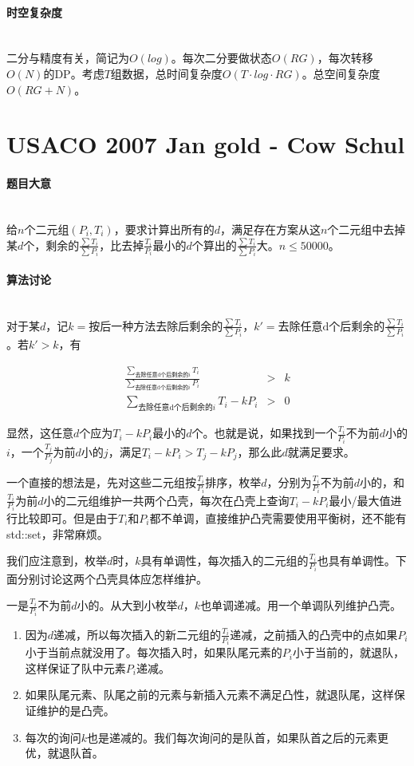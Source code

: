 \documentclass[UTF8]{ctexart}
\newcommand{\myparagraph}[1]{\paragraph{#1}\mbox{}\\}
\theoremstyle{nonumberplain}
\begin{document}
		\myparagraph{时空复杂度}
		
			二分与精度有关，简记为$O(log)$。每次二分要做状态$O(RG)$，每次转移$O(N)$的DP。考虑$T$组数据，总时间复杂度$O(T \cdot log \cdot RG)$。总空间复杂度$O(RG+N)$。
	
	\section{USACO 2007 Jan gold - Cow Schul}
	
		\myparagraph{题目大意}
		
			给$n$个二元组$(P_i,T_i)$，要求计算出所有的$d$，满足存在方案从这$n$个二元组中去掉某$d$个，剩余的$\frac{\sum T_i}{\sum P_i}$，比去掉$\frac{T_i}{P_i}$最小的$d$个算出的$\frac{\sum T_i}{\sum P_i}$大。$n \leq 50000$。
		
		\myparagraph{算法讨论}
		
			对于某$d$，记$k=\mbox{按后一种方法去除后剩余的}\frac{\sum T_i}{\sum P_i}$，$k'=\mbox{去除任意d个后剩余的}\frac{\sum T_i}{\sum P_i}$。若$k'>k$，有
			
			$$\begin{aligned}
				\frac{\sum_{\mbox{去除任意d个后剩余的}i} T_i}{\sum_{\mbox{去除任意d个后剩余的}i} P_i}&>&k\\
				\sum_{\mbox{去除任意d个后剩余的}i}T_i-k P_i&>&0
			\end{aligned}$$
			
			显然，这任意$d$个应为$T_i-k P_i$最小的$d$个。也就是说，如果找到一个$\frac{T_i}{P_i}$不为前$d$小的$i$，一个$\frac{T_j}{P_j}$为前$d$小的$j$，满足$T_i-k P_i>T_j-k P_j$，那么此$d$就满足要求。
			
			一个直接的想法是，先对这些二元组按$\frac{T_i}{P_i}$排序，枚举$d$，分别为$\frac{T_i}{P_i}$不为前$d$小的，和$\frac{T_i}{P_i}$为前$d$小的二元组维护一共两个凸壳，每次在凸壳上查询$T_i-k P_i$最小/最大值进行比较即可。但是由于$T_i$和$P_i$都不单调，直接维护凸壳需要使用平衡树，还不能有std::set，非常麻烦。
			
			我们应注意到，枚举$d$时，$k$具有单调性，每次插入的二元组的$\frac{T_i}{P_i}$也具有单调性。下面分别讨论这两个凸壳具体应怎样维护。
			
			一是$\frac{T_i}{P_i}$不为前$d$小的。从大到小枚举$d$，$k$也单调递减。用一个单调队列维护凸壳。
			
			\begin{enumerate}
				\item 因为$d$递减，所以每次插入的新二元组的$\frac{T_i}{P_i}$递减，之前插入的凸壳中的点如果$P_i$小于当前点就没用了。每次插入时，如果队尾元素的$P_i$小于当前的，就退队，这样保证了队中元素$P_i$递减。
				\item 如果队尾元素、队尾之前的元素与新插入元素不满足凸性，就退队尾，这样保证维护的是凸壳。
				\item 每次的询问$k$也是递减的。我们每次询问的是队首，如果队首之后的元素更优，就退队首。
			\end{enumerate}
			
\end{document}
